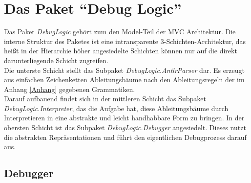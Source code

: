 \documentclass[parskip=full]{scrartcl}
\begin{document}
\section{Das Paket \enquote{Debug Logic}}
\label{DebugLogic}
Das Paket \textit{DebugLogic} gehört zum den Model-Teil der MVC Architektur. Die interne Struktur des Paketes ist eine intransparente 3-Schichten-Architektur, das heißt in der Hierarchie höher angesiedelte Schichten können nur auf die direkt darunterliegende Schicht zugreifen.\\
Die unterste Schicht stellt das Subpaket \textit{DebugLogic.AntlrParser} dar. Es erzeugt aus einfachen Zeichenketten Ableitungsbäume nach den Ableitungsregeln der im Anhang \ref{Anhang} gegebenen Grammatiken.\\ Darauf aufbauend findet sich in der mittleren Schicht das Subpaket \textit{DebugLogic.Interpreter}, das die Aufgabe hat, diese Ableitungsbäume durch Interpretieren in eine abstrakte und leicht handhabbare Form zu bringen. In der obersten Schicht ist das Subpaket \textit{DebugLogic.Debugger} angesiedelt. Dieses nutzt die abstrakten Repräsentationen und führt den eigentlichen Debugprozess darauf aus.
\subsection{Debugger}
\end{document}
